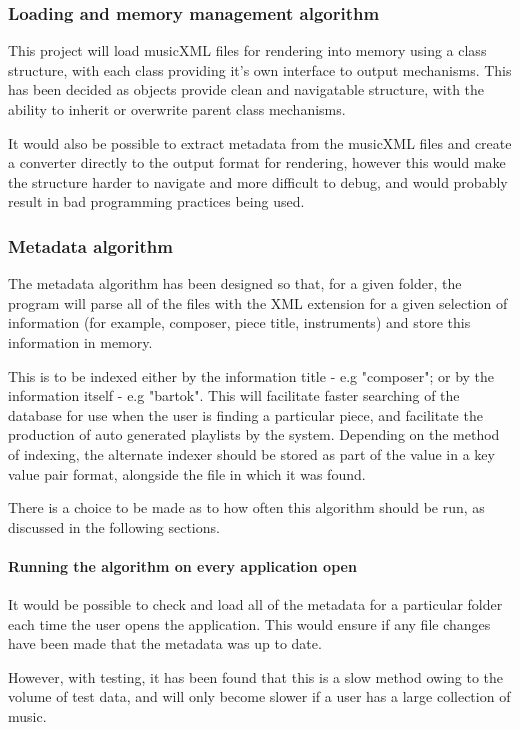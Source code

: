 \subsubsection{Loading and memory management algorithm}
This project will load musicXML files for rendering into memory using a class structure, with each class providing it's own interface to output mechanisms. This has been decided as objects provide clean and navigatable structure, with the ability to inherit or overwrite parent class mechanisms.

It would also be possible to extract metadata from the musicXML files and create a converter directly to the output format for rendering, however this would make the structure harder to navigate and more difficult to debug, and would probably result in bad programming practices being used.



\subsubsection{Metadata algorithm}
The metadata algorithm has been designed so that, for a given folder, the program will parse all of the files with the XML extension for a given selection of information (for example, composer, piece title, instruments) and store this information in memory. 

This is to be indexed either by the information title - e.g "composer"; or by the information itself - e.g "bartok". This will facilitate faster searching of the database for use when the user is finding a particular piece, and facilitate the production of auto generated playlists by the system. Depending on the method of indexing, the alternate indexer should be stored as part of the value in a key value pair format, alongside the file in which it was found.

There is a choice to be made as to how often this algorithm should be run, as discussed in the following sections.

\paragraph{Running the algorithm on every application open}
It would be possible to check and load all of the metadata for a particular folder each time the user opens the application. This would ensure if any file changes have been made that the metadata was up to date.

However, with testing, it has been found that this is a slow method owing to the volume of test data, and will only become slower if a user has a large collection of music. 

